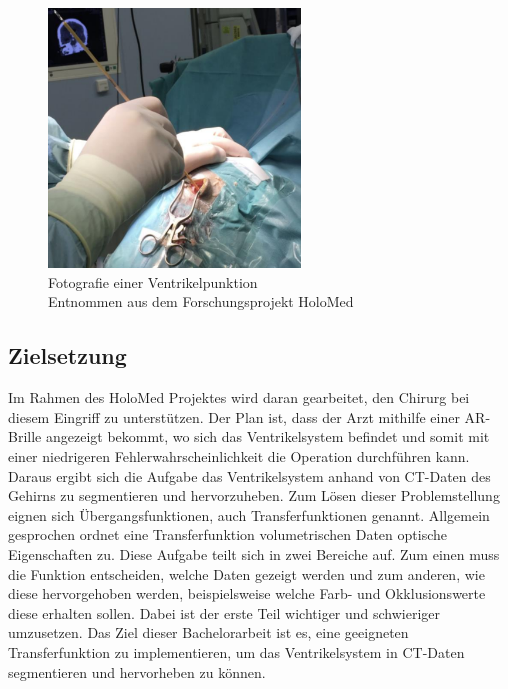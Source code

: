 \begin{figure}[!h] 
\centering 
\includegraphics[width=0.6\textwidth]{Logos/Punktion2.png}
\captionsetup{justification=centering}
\caption{Fotografie einer Ventrikelpunktion  \\ Entnommen aus dem Forschungsprojekt HoloMed \protect\cite{punktion}} 
\label{fig:punktion} 
\end{figure}



\subsection{Zielsetzung}

Im Rahmen des HoloMed Projektes wird daran gearbeitet, den Chirurg bei diesem Eingriff zu unterstützen. Der Plan ist, dass der Arzt mithilfe einer AR-Brille angezeigt bekommt, wo sich das Ventrikelsystem befindet und somit mit einer niedrigeren Fehlerwahrscheinlichkeit die Operation durchführen kann. Daraus ergibt sich die Aufgabe das Ventrikelsystem anhand von CT-Daten des Gehirns zu segmentieren und hervorzuheben.
\newline
Zum Lösen dieser Problemstellung eignen sich Übergangsfunktionen, auch Transferfunktionen genannt. Allgemein gesprochen ordnet eine Transferfunktion volumetrischen Daten optische Eigenschaften zu. Diese Aufgabe teilt sich in zwei Bereiche auf. Zum einen muss die Funktion entscheiden, welche Daten gezeigt werden und zum anderen, wie diese hervorgehoben werden, beispielsweise welche Farb- und Okklusionswerte diese erhalten sollen. Dabei ist der erste Teil wichtiger und schwieriger umzusetzen.
\newline
Das Ziel dieser Bachelorarbeit ist es, eine geeigneten Transferfunktion zu implementieren, um das Ventrikelsystem in CT-Daten segmentieren und hervorheben zu können.



